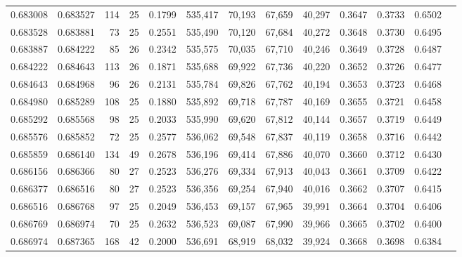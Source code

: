 \begin{tabular}{rrrrrrrrrrrrr}
0.683008 & 0.683527 &   114 &  25 &                                     0.1799 & 535,417 &  70,193 &  67,659 &  40,297 & 0.3647 & 0.3733 & 0.6502 \\
0.683528 & 0.683881 &    73 &  25 &                                     0.2551 & 535,490 &  70,120 &  67,684 &  40,272 & 0.3648 & 0.3730 & 0.6495 \\
0.683887 & 0.684222 &    85 &  26 &                                     0.2342 & 535,575 &  70,035 &  67,710 &  40,246 & 0.3649 & 0.3728 & 0.6487 \\
0.684222 & 0.684643 &   113 &  26 &                                     0.1871 & 535,688 &  69,922 &  67,736 &  40,220 & 0.3652 & 0.3726 & 0.6477 \\
0.684643 & 0.684968 &    96 &  26 &                                     0.2131 & 535,784 &  69,826 &  67,762 &  40,194 & 0.3653 & 0.3723 & 0.6468 \\
0.684980 & 0.685289 &   108 &  25 &                                     0.1880 & 535,892 &  69,718 &  67,787 &  40,169 & 0.3655 & 0.3721 & 0.6458 \\
0.685292 & 0.685568 &    98 &  25 &                                     0.2033 & 535,990 &  69,620 &  67,812 &  40,144 & 0.3657 & 0.3719 & 0.6449 \\
0.685576 & 0.685852 &    72 &  25 &                                     0.2577 & 536,062 &  69,548 &  67,837 &  40,119 & 0.3658 & 0.3716 & 0.6442 \\
0.685859 & 0.686140 &   134 &  49 &                                     0.2678 & 536,196 &  69,414 &  67,886 &  40,070 & 0.3660 & 0.3712 & 0.6430 \\
0.686156 & 0.686366 &    80 &  27 &                                     0.2523 & 536,276 &  69,334 &  67,913 &  40,043 & 0.3661 & 0.3709 & 0.6422 \\
0.686377 & 0.686516 &    80 &  27 &                                     0.2523 & 536,356 &  69,254 &  67,940 &  40,016 & 0.3662 & 0.3707 & 0.6415 \\
0.686516 & 0.686768 &    97 &  25 &                                     0.2049 & 536,453 &  69,157 &  67,965 &  39,991 & 0.3664 & 0.3704 & 0.6406 \\
0.686769 & 0.686974 &    70 &  25 &                                     0.2632 & 536,523 &  69,087 &  67,990 &  39,966 & 0.3665 & 0.3702 & 0.6400 \\
0.686974 & 0.687365 &   168 &  42 &                                     0.2000 & 536,691 &  68,919 &  68,032 &  39,924 & 0.3668 & 0.3698 & 0.6384 \\

\end{tabular}
